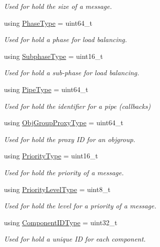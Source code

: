 \begin{DoxyCompactItemize}
\begin{DoxyCompactList}\small\item\em Used for hold the size of a message. \end{DoxyCompactList}\item 
using \hyperlink{namespacevt_a46ce6733d5cdbd735d561b7b4029f6d7}{Phase\+Type} = uint64\+\_\+t
\begin{DoxyCompactList}\small\item\em Used for hold a phase for load balancing. \end{DoxyCompactList}\item 
using \hyperlink{namespacevt_ae78cbfdf1e57470e33eedb074f2beeba}{Subphase\+Type} = uint16\+\_\+t
\begin{DoxyCompactList}\small\item\em Used for hold a sub-\/phase for load balancing. \end{DoxyCompactList}\item 
using \hyperlink{namespacevt_ac9852acda74d1896f48f406cd72c7bd3}{Pipe\+Type} = uint64\+\_\+t
\begin{DoxyCompactList}\small\item\em Used for hold the identifier for a pipe (callbacks) \end{DoxyCompactList}\item 
using \hyperlink{namespacevt_ad7cae989df485fccca57f0792a880a8e}{Obj\+Group\+Proxy\+Type} = uint64\+\_\+t
\begin{DoxyCompactList}\small\item\em Used for hold the proxy ID for an objgroup. \end{DoxyCompactList}\item 
using \hyperlink{namespacevt_a86bff9f556eb761b27fc8600d006ac04}{Priority\+Type} = uint16\+\_\+t
\begin{DoxyCompactList}\small\item\em Used for hold the priority of a message. \end{DoxyCompactList}\item 
using \hyperlink{namespacevt_a53e07fdb3351b0f263e0dfd51b968d5e}{Priority\+Level\+Type} = uint8\+\_\+t
\begin{DoxyCompactList}\small\item\em Used for hold the level for a priority of a message. \end{DoxyCompactList}\item 
using \hyperlink{namespacevt_ab6ac935c168b809c422d5121da4f2700}{Component\+I\+D\+Type} = uint32\+\_\+t
\begin{DoxyCompactList}\small\item\em Used for hold a unique ID for each component. \end{DoxyCompactList}\item 

\end{DoxyCompactItemize}
